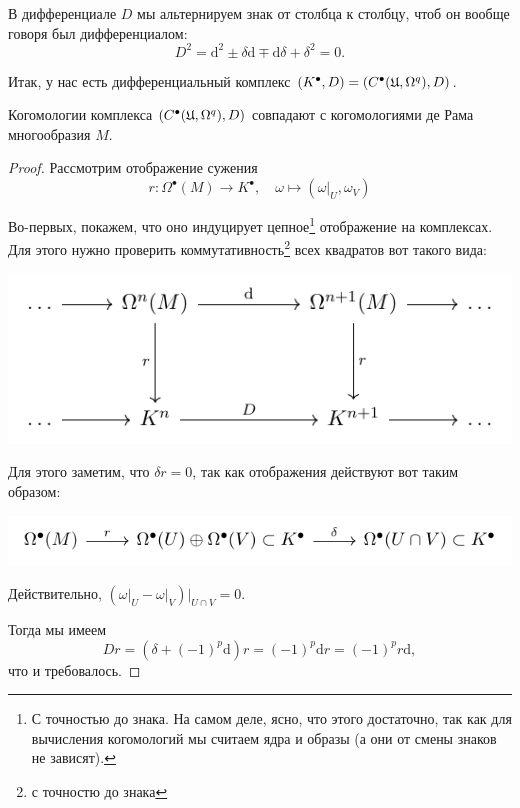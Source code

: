	 \begin{remark}
	 	В дифференциале $D$ мы альтернируем знак от столбца к столбцу, чтоб он вообще говоря был дифференциалом: 
	 	\[
	 		D^2 = \mathrm{d}^2 \pm \delta \mathrm{d} \mp \mathrm{d}\delta + \delta^2 = 0. 
	 	\]
	 \end{remark}

	 Итак, у нас есть дифференциальный комплекс $(K^{\bullet}, D) = (C^{\bullet}(\mathfrak{U}, \Omega^q), D)$.

	 \begin{theorem} 
	  	Когомологии комплекса $(C^{\bullet}(\mathfrak{U}, \Omega^q), D)$ совпадают с когомологиями де Рама многообразия $M$. 
	  \end{theorem} 
	  \begin{proof}
	  	Рассмотрим отображение сужения 
	  	\[
	  		r\colon \Omega^{\bullet}(M) \to K^{\bullet}, \quad \omega \mapsto (\omega\vert_{U}, \omega_{V}) 	
	  	\]

	  	Во-первых, покажем, что оно индуцирует цепное\footnote{С точностью до знака. На самом деле, ясно, что этого достаточно, так как для вычисления когомологий мы считаем ядра и образы (а они от смены знаков не зависят). } отображение на комплексах. Для этого нужно проверить коммутативность\footnote{с точностю до знака} всех квадратов вот такого вида:
	  	\begin{center}
	  		\includegraphics{lectures/7/pictures/cd_31.pdf}
	  	\end{center}
	  	
	  	Для этого заметим, что $\delta r = 0$, так как отображения действуют вот таким образом:
	  	\begin{center}
	  		\includegraphics{lectures/7/pictures/cd_32.pdf}
	  	\end{center}
	  	Действительно, $(\omega\vert_{U} - \omega\vert_{V})\vert_{U \cap V} = 0$. 

	  	Тогда мы имеем
	  	\[
	  		Dr = (\delta + (-1)^p\mathrm{d})r = (-1)^p \mathrm{d}r = (-1)^p r \mathrm{d},
	  	\]
	  	что и требовалось. 


\end{proof}
